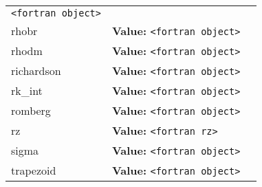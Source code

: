 \begin{longtable}{|p{\varnamewidth}|p{\vardescrwidth}|l}
{\tt {\textless}fortran object{\textgreater}}&\\
\cline{1-2}
\raggedright r\-h\-o\-b\-r\- & \raggedright \textbf{Value:} 
{\tt {\textless}fortran object{\textgreater}}&\\
\cline{1-2}
\raggedright r\-h\-o\-d\-m\- & \raggedright \textbf{Value:} 
{\tt {\textless}fortran object{\textgreater}}&\\
\cline{1-2}
\raggedright r\-i\-c\-h\-a\-r\-d\-s\-o\-n\- & \raggedright \textbf{Value:} 
{\tt {\textless}fortran object{\textgreater}}&\\
\cline{1-2}
\raggedright r\-k\-4\-\_\-i\-n\-t\- & \raggedright \textbf{Value:} 
{\tt {\textless}fortran object{\textgreater}}&\\
\cline{1-2}
\raggedright r\-o\-m\-b\-e\-r\-g\- & \raggedright \textbf{Value:} 
{\tt {\textless}fortran object{\textgreater}}&\\
\cline{1-2}
\raggedright r\-z\- & \raggedright \textbf{Value:} 
{\tt {\textless}fortran rz{\textgreater}}&\\
\cline{1-2}
\raggedright s\-i\-g\-m\-a\- & \raggedright \textbf{Value:} 
{\tt {\textless}fortran object{\textgreater}}&\\
\cline{1-2}
\raggedright t\-r\-a\-p\-e\-z\-o\-i\-d\- & \raggedright \textbf{Value:} 
{\tt {\textless}fortran object{\textgreater}}&\\
\cline{1-2}
\end{longtable}

